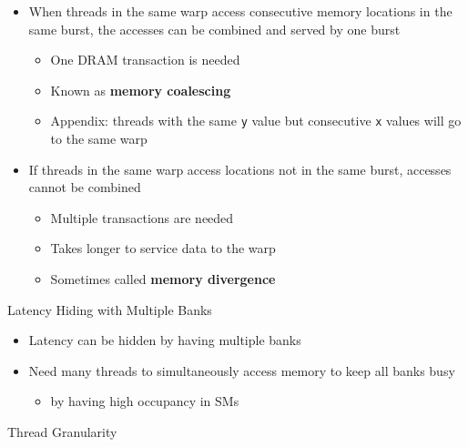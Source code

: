 \documentclass{article}
\begin{document}
\begin{itemize}
\item When threads in the same warp access consecutive memory locations in the same burst, the accesses can be combined and served by one burst
\begin{itemize}
\item One DRAM transaction is needed
\item Known as \textbf{memory coalescing}
\item Appendix: threads with the same \texttt{y} value but consecutive \texttt{x} values will go to the same warp
\end{itemize}
\item If threads in the same warp access locations not in the same burst, accesses cannot be combined
\begin{itemize}
\item Multiple transactions are needed
\item Takes longer to service data to the warp
\item Sometimes called \textbf{memory divergence}

\end{itemize}
\end{itemize}
Latency Hiding with Multiple Banks

\begin{itemize}
\item Latency can be hidden by having multiple banks
\item Need many threads to simultaneously access memory to keep all banks busy
\begin{itemize}
\item by having high occupancy in SMs

\end{itemize}
\end{itemize}
Thread Granularity
\end{document}

